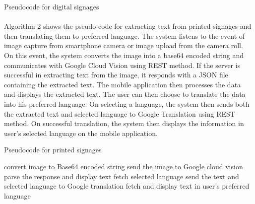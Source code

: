 \documentclass[12pt]{article}
\makeatletter
\def\BState{\State\hskip-\ALG@thistlm}
\makeatother
\begin{document}
\begin{algorithm}
\caption{Pseudocode for digital signages}\label{euclid}
\end{algorithm}


\paragraph{} Algorithm 2 shows the pseudo-code for extracting text from printed signages and then translating them to preferred language. The system listens to the event of image capture from smartphone camera or image upload from the camera roll. On this event, the system converts the image into a base64 encoded string and communicates with Google Cloud Vision using REST method. If the server is successful in extracting text from the image, it responds with a JSON file containing the extracted text. The mobile application then processes the data and displays the extracted text. The user can then choose to translate the data into his preferred language. On selecting a language, the system then sends both the extracted text and selected language to Google Translation using REST method. On successful translation, the system then displays the information in user's selected language on the mobile application.

\begin{algorithm}
\caption{Pseudocode for printed signages}\label{euclid}
\begin{algorithmic}[1]
\State convert image to Base64 encoded string
\State send the image to Google cloud vision 
\State 	parse the response and display text
	\State fetch selected language
	\State send the text and selected language to Google translation
	\State fetch and display text in user's preferred language
\EndProcedure
\EndIf
\EndProcedure
\end{algorithmic}
\end{algorithm}
\end{document}
